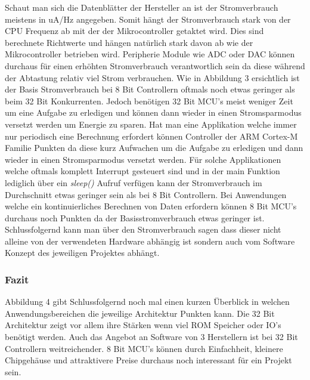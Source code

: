 \documentclass[MES,Master,ngerman]{twbook}%
\begin{document}
Schaut man sich die Datenblätter der Hersteller an ist der Stromverbrauch meistens in uA/Hz angegeben. Somit hängt der Stromverbrauch stark von der CPU Frequenz ab mit der der Mikrocontroller getaktet wird. Dies sind berechnete Richtwerte und hängen natürlich stark davon ab wie der Mikrocontroller betrieben wird. Peripherie Module wie ADC oder DAC können durchaus für einen erhöhten Stromverbrauch verantwortlich sein da diese während der Abtastung relativ viel Strom verbrauchen. Wie in Abbildung 3 ersichtlich ist der Basis Stromverbrauch bei 8 Bit Controllern oftmals noch etwas geringer als beim 32 Bit Konkurrenten. Jedoch benötigen 32 Bit MCU's meist weniger Zeit um eine Aufgabe zu erledigen und können dann wieder in einen Stromsparmodus versetzt werden um Energie zu sparen. Hat man eine Applikation welche immer nur periodisch eine Berechnung erfordert können Controller der ARM Cortex-M Familie Punkten da diese kurz Aufwachen um die Aufgabe zu erledigen und dann wieder in einen Stromsparmodus versetzt werden. Für solche Applikationen welche oftmals komplett Interrupt gesteuert sind und in der main Funktion lediglich über ein \textit{sleep()} Aufruf verfügen kann der Stromverbrauch im Durchschnitt etwas geringer sein als bei 8 Bit Controllern. Bei Anwendungen welche ein kontinuierliches Berechnen von Daten erfordern können 8 Bit MCU's durchaus noch Punkten da der Basisstromverbrauch etwas geringer ist. Schlussfolgernd kann man über den Stromverbrauch sagen dass dieser nicht alleine von der verwendeten Hardware abhängig ist sondern auch vom Software Konzept des jeweiligen Projektes abhängt.
\newpage
\subsubsection{Fazit}

Abbildung 4 gibt Schlussfolgernd noch mal einen kurzen Überblick in welchen Anwendungsbereichen die jeweilige Architektur Punkten kann. Die 32 Bit Architektur zeigt vor allem ihre Stärken wenn viel ROM Speicher oder IO's benötigt werden. Auch das Angebot an Software von 3 Herstellern ist bei 32 Bit Controllern weitreichender. 8 Bit MCU's können durch Einfachheit, kleinere Chipgehäuse und attraktivere Preise durchaus noch interessant für ein Projekt sein. \cite{8 Bit vs 32 Bit (EECatalog) }
\end{document}
